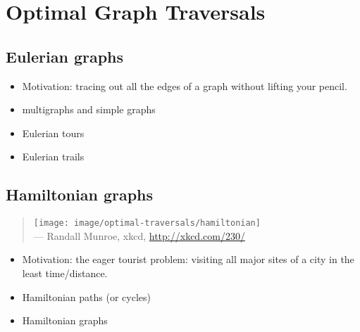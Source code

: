 
\chapter{Optimal Graph Traversals}
\label{chap:optimal_traversals}



\section{Eulerian graphs}

\begin{itemize}
\item Motivation: tracing out all the edges of a graph without lifting
  your pencil.

\item multigraphs and simple graphs

\item Eulerian tours

\item Eulerian trails
\end{itemize}



\section{Hamiltonian graphs}

\begin{quote}
\texttt{[image: image/optimal-traversals/hamiltonian]} \\
\noindent
--- Randall Munroe, xkcd,
\url{http://xkcd.com/230/}
\end{quote}

\begin{itemize}
\item Motivation: the eager tourist problem: visiting all major sites
  of a city in the least time/distance.

\item Hamiltonian paths (or cycles)

\item Hamiltonian graphs
\end{itemize}

